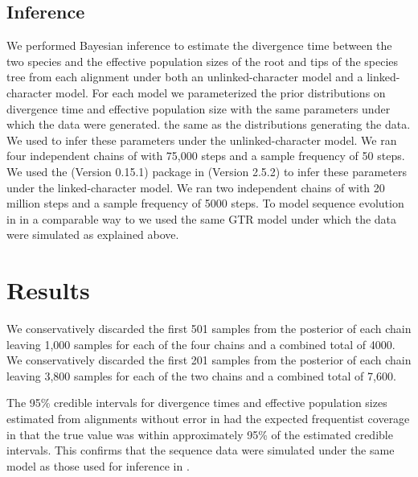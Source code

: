 \subsection{Inference}
We performed Bayesian inference to estimate the divergence time between the two species and the effective 
population sizes of the root and tips of the species tree from each alignment 
under both an unlinked-character model and a linked-character model. For each 
model we parameterized the prior distributions on divergence time and effective
population size with the same parameters under which the data were generated. 
the same as the distributions generating the data.
We used \ecoevolity
\citep[Version 0.3.2; dev branch commit a7e9bf2;][]{Oaks2018ecoevolity}
to infer these parameters under the 
unlinked-character model.
We ran four independent chains of \ecoevolity with 75,000 steps and a sample 
frequency of 50 steps.
We used the \beast (Version 0.15.1) \citep{@ogilvieStarBEAST2BringsFaster2017} 
package in \beastcore (Version 2.5.2) \citep{@bouckaertBEASTSoftwarePlatform2014}
to infer these parameters under the linked-character model. 
We ran two independent chains of \beast with 20 million steps and a 
sample frequency of 5000 steps. 
To model sequence evolution in \beast in a comparable way to \ecoevolity we used 
the same GTR model under which the data were simulated as explained above.


\section{Results}



We conservatively discarded the first 501 samples from the posterior of each 
\ecoevolity chain leaving 1,000 samples for each of the four chains and a combined
total of 4000.
We conservatively discarded the first 201 samples from the posterior of each 
\beast chain leaving 3,800 samples for each of the two chains and a combined
total of 7,600.


The 95\% credible intervals for divergence times and effective population 
sizes estimated from alignments without error in \beast had the expected 
frequentist coverage in that the true value was within approximately 95\% of the 
estimated credible intervals. 
This confirms that the sequence data were simulated under the same model as 
those used for inference in \beast. 


